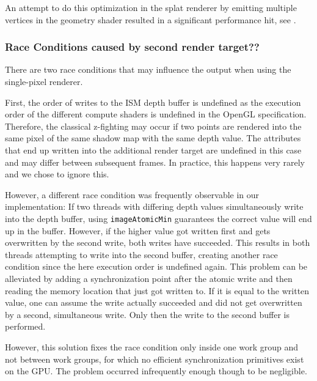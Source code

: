 
An attempt to do this optimization in the splat renderer by emitting multiple vertices in the geometry shader resulted in a significant performance hit, see .


\subsubsection{Race Conditions caused by second render target??}
\label{sec:impl:raceCondition}

There are two race conditions that may influence the output when using the single-pixel renderer.

First, the order of writes to the ISM depth buffer is undefined as the execution order of the different compute shaders is undefined in the OpenGL specification. Therefore, the classical z-fighting may occur if two points are rendered into the same pixel of the same shadow map with the same depth value. The attributes that end up written into the additional render target are undefined in this case and may differ between subsequent frames. In practice, this happens very rarely and we chose to ignore this.

However, a different race condition was frequently observable in our implementation:
If two threads with differing depth values simultaneously write into the depth buffer, using \texttt{imageAtomicMin} guarantees the correct value will end up in the buffer. However, if the higher value got written first and gets overwritten by the second write, both writes have succeeded. This results in both threads attempting to write into the second buffer, creating another race condition since the here execution order is undefined again. This problem can be alleviated by adding a synchronization point after the atomic write and then reading the memory location that just got written to. If it is equal to the written value, one can assume the write actually succeeded and did not get overwritten by a second, simultaneous write. Only then the write to the second buffer is performed.

However, this solution fixes the race condition only inside one work group and not between work groups, for which no efficient synchronization primitives exist on the GPU. The problem occurred infrequently enough though to be negligible.

